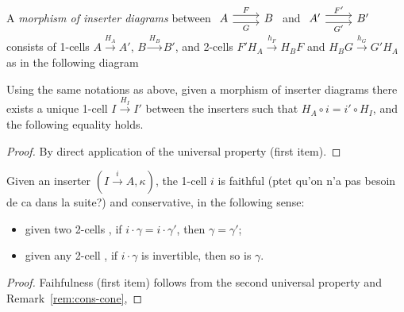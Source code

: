  \begin{definition}
   A \emph{morphism of inserter diagrams} between
   $
   \begin{tikzcd}
     A \doublerightarrow{r}{F}{G} & B
   \end{tikzcd}
   $
   and 
   $
   \begin{tikzcd}
     A' \doublerightarrow{r}{F'}{G'} & B'
   \end{tikzcd}
   $
   consists of 1-cells $A \xrightarrow{H_A} A'$, $B\xrightarrow{H_B} B'$, and
   2-cells $  F' H_A \xrightarrow{h_F}  H_BF$ and $H_B G \xrightarrow{h_G} G' H_A$
   as in the following diagram
   \[

     \]
   \end{definition}

      \begin{lemma}
   \label{lem:mor-inserter}
   Using the same notations as above, given a morphism of inserter diagrams
   there exists a unique
   1-cell $I\xrightarrow{H_I}I'$ between the inserters such that $H_A ∘ i = i' ∘
   H_I$, and the following equality holds.
  \[

  \]
  \end{lemma}
  \begin{proof}
   By direct application of the universal property (first item).
  \end{proof}
  \begin{lemma}
    Given an inserter $(I\xrightarrow{i}A, κ)$, 
    the 1-cell $i$ is faithful (ptet qu'on n'a pas besoin de ca dans la suite?) and conservative, in the following sense:
    \begin{itemize}
      \item 
        given two 2-cells
        $

        $, if $ i· γ = i· γ'$, then $γ = γ'$;
    \item 
      given any 2-cell
      $
      
      $, if $i· γ$ is invertible, then so is $γ$.
    \end{itemize}
  \end{lemma}
  \begin{proof}
    Faihfulness (first item) follows from the second universal property and 
    Remark~\ref{rem:cons-cone}, 
  \end{proof}




